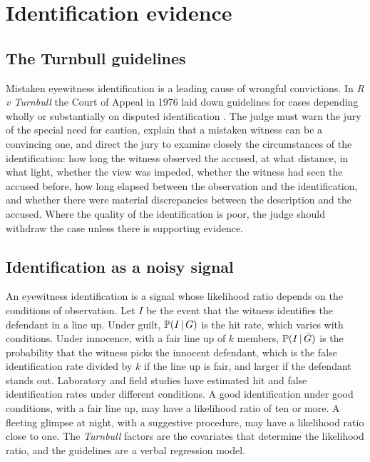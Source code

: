 \section{Identification evidence}

\subsection{The Turnbull guidelines}

Mistaken eyewitness identification is a leading cause of wrongful convictions. In \emph{R v Turnbull} the Court of Appeal in 1976 laid down guidelines for cases depending wholly or substantially on disputed identification \citep{turnbull1977}. The judge must warn the jury of the special need for caution, explain that a mistaken witness can be a convincing one, and direct the jury to examine closely the circumstances of the identification: how long the witness observed the accused, at what distance, in what light, whether the view was impeded, whether the witness had seen the accused before, how long elapsed between the observation and the identification, and whether there were material discrepancies between the description and the accused. Where the quality of the identification is poor, the judge should withdraw the case unless there is supporting evidence.

\subsection{Identification as a noisy signal}

An eyewitness identification is a signal whose likelihood ratio depends on the conditions of observation. Let $I$ be the event that the witness identifies the defendant in a line up. Under guilt, $\mathbb{P}(I\,\vert\, G)$ is the hit rate, which varies with conditions. Under innocence, with a fair line up of $k$ members, $\mathbb{P}(I\,\vert\,\bar G)$ is the probability that the witness picks the innocent defendant, which is the false identification rate divided by $k$ if the line up is fair, and larger if the defendant stands out. Laboratory and field studies have estimated hit and false identification rates under different conditions. A good identification under good conditions, with a fair line up, may have a likelihood ratio of ten or more. A fleeting glimpse at night, with a suggestive procedure, may have a likelihood ratio close to one. The \emph{Turnbull} factors are the covariates that determine the likelihood ratio, and the guidelines are a verbal regression model.

